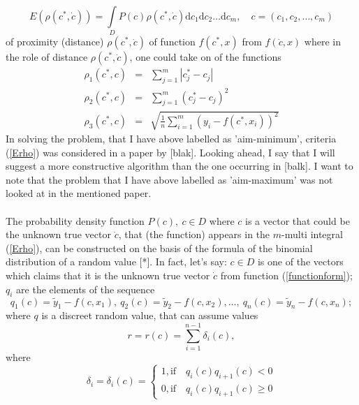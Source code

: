 \documentclass[a4paper]{article}
\numberwithin{equation}{subsection}
\begin{document}
\begin{equation}
E(\rho(c^{*},\dot{c}))= \int\limits_{D}P(c)\rho(c^{*},\dot{c})\mathrm{d}c_{1}\mathrm{d}c_{2}\dots \mathrm{d}c_{m}, \quad c = (c_{1},c_{2},\dots,c_{m}) \label{Erho}
\end{equation}
of proximity (distance) $\rho(c^{*},\dot{c})$ of function $f(c^{*},x)$ from $f(\dot{c},x)$ where in the role of distance $\rho(c^{*},\dot{c})$, one could take on of the functions
\begin{eqnarray}
\rho_{1}(c^{*},c) &=& \sum\limits_{j=1}^{m} \left| c_{j}^{*}-c_{j} \right| \label{rho1}\\
\rho_{2}(c^{*},c) &=& \sum\limits_{j=1}^{m} \left( c_{j}^{*}-c_{j} \right)^{2} \label{rho2}\\
\rho_{3}(c^{*},c) &=& \sqrt{\frac{1}{n}\sum\limits_{i=1}^{m} \left( y_{i}-f(c^{*},x_{i}) \right)^{2}} \label{rho3}
\end{eqnarray}
In solving the problem, that I have above labelled as 'aim-minimum', criteria (\ref{Erho}) was considered in a paper by [blak]. Looking ahead, I say that I will suggest a more constructive algorithm than the one occurring in [balk]. I want to note that the problem that I have above labelled as 'aim-maximum' was not looked at in the mentioned paper. \\
\\
The probability density function $P(c),\  c \in D$ where $c$ is a vector that could be the unknown true vector $\dot{c}$, that (the function) appears in the $m$-multi integral (\ref{Erho}), can be constructed on the basis of the formula of the binomial distribution of a random value [*]. In fact, let's say: $c \in D$ is one of the vectors which claims that it is the unknown true vector $ \dot{c}$ from function (\ref{functionform}); $q_{i}$ are the elements of the sequence
\begin{equation}
q_{1}(c)=\tilde{y}_{1}-f(c,x_{1}),\ q_{2}(c)=\tilde{y}_{2}-f(c,x_{2}), \dots, \ q_{n}(c)=\tilde{y}_{n}-f(c,x_{n}); \label{sequence}
\end{equation}
where $q$ is a discreet random value, that can assume values
\begin{equation}
r=r(c)=\sum\limits_{i=1}^{n-1} \delta_{i}(c),
\end{equation}
where
\begin{equation}
\delta_{i}=\delta_{i}(c)=
\begin{cases} 
      1, \mathrm{if} \quad q_{i}(c)q_{i+1}(c)<0\\
      0, \mathrm{if} \quad q_{i}(c)q_{i+1}(c)\geq 0
   \end{cases}
\end{equation}
\end{document}
